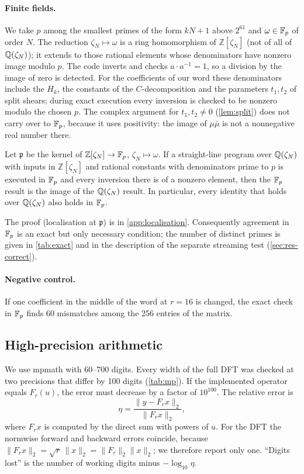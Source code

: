 \documentclass[11pt]{article}
\theoremstyle{plain}
\newcommand{\norm}[1]{\lVert #1\rVert}
\newcommand{\Z}{\mathbb{Z}}
\begin{document}
\paragraph{Finite fields.}
We take $p$ among the smallest primes of the form $kN+1$ above $2^{61}$ and $\omega\in\mathbb{F}_p$ of order $N$. The reduction $\zeta_N\mapsto\omega$ is a ring homomorphism of $\Z[\zeta_N]$ (not of all of $\mathbb{Q}(\zeta_N)$); it extends to those rational elements whose denominators have nonzero image modulo $p$. The code inverts and checks $a\cdot a^{-1}=1$, so a division by the image of zero is detected. For the coefficients of our word these denominators include the $H_k$, the constants of the $C$-decomposition and the parameters $t_1,t_2$ of split shears; during exact execution every inversion is checked to be nonzero modulo the chosen $p$. The complex argument for $t_1,t_2\ne0$ (\cref{lem:split}) does not carry over to $\mathbb{F}_p$, because it uses positivity: the image of $\mu\bar\mu$ is not a nonnegative real number there.
\begin{proposition}\label{prop:localisation}
Let $\mathfrak p$ be the kernel of $\Z[\zeta_N]\to\Fp$, $\zeta_N\mapsto\omega$. If a straight-line program over $\mathbb{Q}(\zeta_N)$ with inputs in $\Z[\zeta_N]$ and rational constants with denominators prime to $p$ is executed in $\mathbb{F}_p$ and every inversion there is of a nonzero element, then the $\mathbb{F}_p$ result is the image of the $\mathbb{Q}(\zeta_N)$ result. In particular, every identity that holds over $\mathbb{Q}(\zeta_N)$ also holds in $\mathbb{F}_p$.
\end{proposition}
The proof (localisation at $\mathfrak p$) is in \cref{app:localisation}. Consequently agreement in $\mathbb{F}_p$ is an exact but only necessary condition; the number of distinct primes is given in \cref{tab:exact} and in the description of the separate streaming test (\cref{sec:res-correct}).

\paragraph{Negative control.}
If one coefficient in the middle of the word at $r=16$ is changed, the exact check in $\mathbb{F}_p$ finds 60 mismatches among the 256 entries of the matrix.

\subsection{High-precision arithmetic}\label{sec:mp}
We use mpmath with 60--700 digits. Every width of the full DFT was checked at two precisions that differ by 100 digits (\cref{tab:mp}). If the implemented operator equals $F_r(u)$, the error must decrease by a factor of $10^{100}$. The relative error is
\begin{equation}\label{eq:relerr}
\eta=\frac{\norm{y-F_r x}_2}{\norm{F_r x}_2},
\end{equation}
where $F_r x$ is computed by the direct sum with powers of $u$. For the DFT the normwise forward and backward errors coincide, because $\norm{F_r x}_2=\sqrt r\,\norm{x}_2=\norm{F_r}_2\norm{x}_2$; we therefore report only one. ``Digits lost'' is the number of working digits minus $-\log_{10}\eta$.
\end{document}
